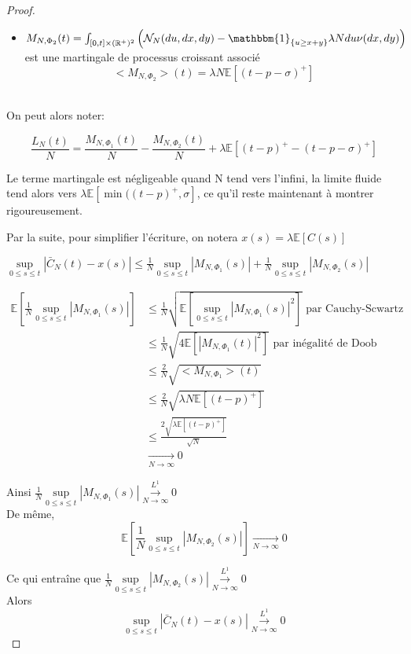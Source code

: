 \documentclass[12pt,a4paper]{article}
\newcommand{\E}[1]{\mathbb{E}\left[ #1 \right]}
\newcommand{\R}{\mathbb{R}}
\newcommand{\1}[1]{\mathbbm{1}_{\{#1\}} }
\theoremstyle{definition}
\begin{document}
{\begin{proof}
\begin{itemize}
  
\item  $M_{N,\Phi_2}(t) = \int_{[0,t]\times (\R^+)^2}  \left(\mathcal{N}_N(du,dx,dy)-\1{u\geq x+y }\lambda N du \nu(dx,dy)\right)$ est une martingale de processus croissant associé \\
$$<M_{N,\Phi_2}>(t) = \lambda N \E{(t-p-\sigma)^+}$$\\
\end{itemize}
On peut alors noter:

$$\frac{L_N(t)}{N} = \frac{M_{N,\Phi_1}(t)}{N} - \frac{M_{N,\Phi_2}(t)}{N} + \lambda  \E{(t-p)^+-(t-p-\sigma)^+}$$

Le terme martingale est négligeable quand N tend vers l'infini, la limite fluide tend alors vers $\lambda  \E{\min((t-p)^+,\sigma}$, ce qu'il reste maintenant à montrer rigoureusement.

Par la suite, pour simplifier l'écriture, on notera $x(s) = \lambda \E{C(s)}$

$\underset{0\leq s \leq t}{\sup} |\bar{C}_N(t)-x(s)| \leq \frac{1}{N}\underset{0\leq s \leq t}{\sup} |M_{N,\Phi_1}(s)| + \frac{1}{N}\underset{0\leq s \leq t}{\sup} |M_{N,\Phi_2}(s)| $

\begin{align*}
\E{\frac{1}{N}\underset{0\leq s \leq t}{\sup} |M_{N,\Phi_1}(s)|} &\leq \frac{1}{N}\sqrt{\E{\underset{0\leq s \leq t}{\sup} |M_{N,\Phi_1}(s)|^2}} \text{ par Cauchy-Scwartz}\\
& \leq \frac{1}{N}\sqrt{4 \E{|M_{N,\Phi_1}(t)|^2}}  \text{ par inégalité de Doob}\\
& \leq \frac{2}{N}\sqrt{<M_{N,\Phi_1}>(t)}\\
&\leq \frac{2}{N}\sqrt{ \lambda N \E{(t-p)^+}}\\
&\leq \frac{2\sqrt{ \lambda \E{(t-p)^+}}}{\sqrt{N}}\\
& \underset{N \to \infty}{\to} 0
\end{align*}


Ainsi $\frac{1}{N}\underset{0\leq s \leq t}{\sup} |M_{N,\Phi_1}(s)|\overset{L^1}{\underset{N \to \infty}{\to}} 0$\\
 
De même, $$\E{\frac{1}{N}\underset{0\leq s \leq t}{\sup} |M_{N,\Phi_2}(s)|} \underset{N \to \infty}{\to} 0$$

Ce qui entraîne que $\frac{1}{N}\underset{0\leq s \leq t}{\sup} |M_{N,\Phi_2}(s)|\overset{L^1}{\underset{N \to \infty}{\to}} 0$\\


Alors $$ \underset{0\leq s \leq t}{\sup} |\bar{C}_N(t)-x(s)|\overset{L^1}{\underset{N \to \infty}{\to}} 0$$



\end{proof}}
\end{document}
